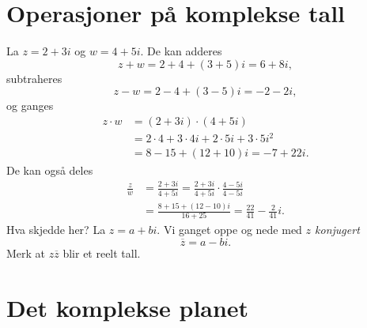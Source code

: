 \section*{Operasjoner på komplekse tall}
La $z=2+3i$ og $w=4+5i$. De kan adderes
\[
z+w=2+4+(3+5)i=6+8i,
\]
subtraheres
\[
z-w=2-4+(3-5)i=-2-2i,
\]
og ganges 
\begin{align*}
z\cdot w&=(2+3i)\cdot(4+5i)\\&=2\cdot 4+3\cdot 4i+2\cdot 5i+3\cdot 5 i^2\\&=8-15+(12+10)i=-7+22i.
\end{align*}
De kan også deles
\begin{align*}
\frac{z}{w}&=\frac{2+3i}{4+5i}=\frac{2+3i}{4+5i}\cdot\frac{4-5i}{4-5i}\\&=\frac{8+15+(12-10)i}{16+25}=\frac{22}{41}-\frac{2}{41}i.
\end{align*}
Hva skjedde her? La $z=a+bi$. 
Vi ganget oppe og nede med \emph{$z$ konjugert}
\[
\overline z =a-bi.
\]
Merk at $z\overline z$ blir et reelt tall. 



\section*{Det komplekse planet}

